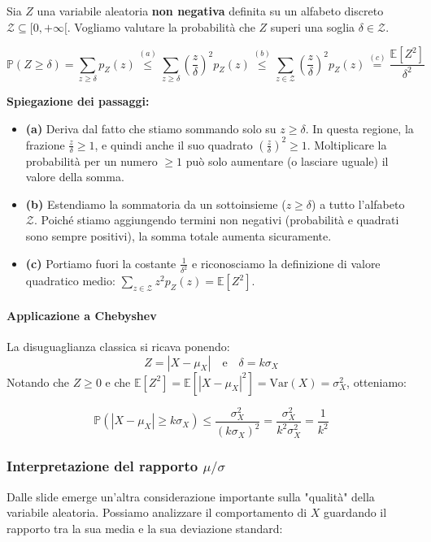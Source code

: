 Sia $Z$ una variabile aleatoria \textbf{non negativa} definita su un alfabeto discreto $\mathcal{Z} \subseteq [0, +\infty[$. Vogliamo valutare la probabilità che $Z$ superi una soglia $\delta \in \mathcal{Z}$.

\begin{equation}
\mathbb{P}(Z \ge \delta) = \sum_{z \ge \delta} p_Z(z) 
\stackrel{(a)}{\le} \sum_{z \ge \delta} \left(\frac{z}{\delta}\right)^2 p_Z(z) 
\stackrel{(b)}{\le} \sum_{z \in \mathcal{Z}} \left(\frac{z}{\delta}\right)^2 p_Z(z) 
\stackrel{(c)}{=} \frac{\mathbb{E}[Z^2]}{\delta^2}
\end{equation}

\textbf{Spiegazione dei passaggi:}
\begin{itemize}
    \item \textbf{(a)} Deriva dal fatto che stiamo sommando solo su $z \ge \delta$. In questa regione, la frazione $\frac{z}{\delta} \ge 1$, e quindi anche il suo quadrato $\left(\frac{z}{\delta}\right)^2 \ge 1$. Moltiplicare la probabilità per un numero $\ge 1$ può solo aumentare (o lasciare uguale) il valore della somma.
    \item \textbf{(b)} Estendiamo la sommatoria da un sottoinsieme ($z \ge \delta$) a tutto l'alfabeto $\mathcal{Z}$. Poiché stiamo aggiungendo termini non negativi (probabilità e quadrati sono sempre positivi), la somma totale aumenta sicuramente.
    \item \textbf{(c)} Portiamo fuori la costante $\frac{1}{\delta^2}$ e riconosciamo la definizione di valore quadratico medio: $\sum_{z \in \mathcal{Z}} z^2 p_Z(z) = \mathbb{E}[Z^2]$.
\end{itemize}

\paragraph{Applicazione a Chebyshev}
La disuguaglianza classica si ricava ponendo:
\[ Z = |X - \mu_X| \quad \text{e} \quad \delta = k\sigma_X \]
Notando che $Z \ge 0$ e che $\mathbb{E}[Z^2] = \mathbb{E}[|X-\mu_X|^2] = \text{Var}(X) = \sigma_X^2$, otteniamo:

\[
\mathbb{P}(|X - \mu_X| \ge k\sigma_X) \le \frac{\sigma_X^2}{(k\sigma_X)^2} = \frac{\sigma_X^2}{k^2 \sigma_X^2} = \frac{1}{k^2}
\]

\subsubsection{Interpretazione del rapporto $\mu / \sigma$}
Dalle slide emerge un'altra considerazione importante sulla "qualità" della variabile aleatoria.
Possiamo analizzare il comportamento di $X$ guardando il rapporto tra la sua media e la sua deviazione standard:

